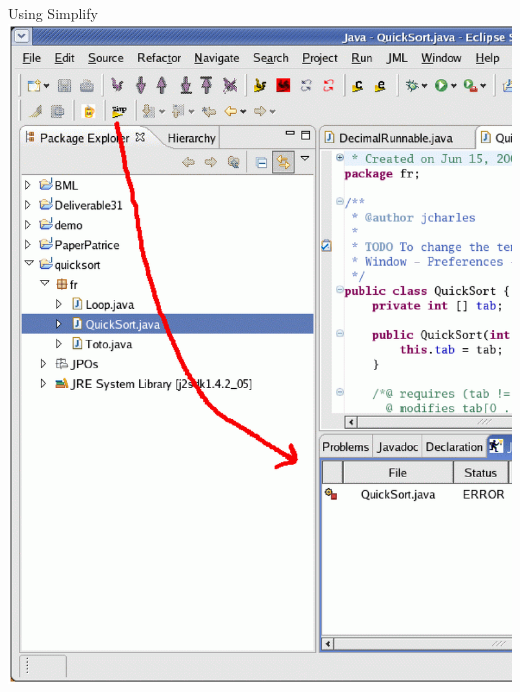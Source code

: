 \documentclass[final,nocolorBG,a4,mobius,nototal,pdf,slideColor]{prosper}
\begin{document}
\begin{slide}{Using Simplify}
\vspace*{-1.5em}
\includegraphics[height=\textheight]{screen2.ps}
\end{slide}
\end{document}
